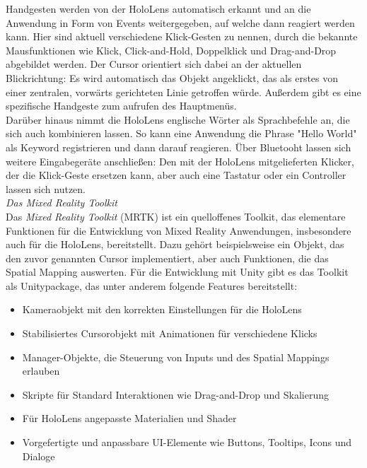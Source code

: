 Handgesten werden von der HoloLens automatisch erkannt und an die Anwendung in Form von Events weitergegeben, auf welche dann reagiert werden kann. Hier sind aktuell verschiedene Klick-Gesten zu nennen, durch die bekannte Mausfunktionen wie Klick, Click-and-Hold, Doppelklick und Drag-and-Drop abgebildet werden. Der Cursor orientiert sich dabei an der aktuellen Blickrichtung: Es wird automatisch das Objekt angeklickt, das als erstes von einer zentralen, vorwärts gerichteten Linie getroffen würde. Außerdem gibt es eine spezifische Handgeste zum aufrufen des Hauptmenüs.\\

Darüber hinaus nimmt die HoloLens englische Wörter als Sprachbefehle an, die sich auch kombinieren lassen. So kann eine Anwendung die Phrase "Hello World" als Keyword registrieren und dann darauf reagieren. Über Bluetooht lassen sich weitere Eingabegeräte anschließen: Den mit der HoloLens mitgelieferten Klicker, der die Klick-Geste ersetzen kann, aber auch eine Tastatur oder ein Controller lassen sich nutzen.\\

\vspace{4px}
\textit{Das Mixed Reality Toolkit}\\
Das \textit{Mixed Reality Toolkit} (MRTK) ist ein quelloffenes Toolkit, das elementare Funktionen für die Entwicklung von Mixed Reality Anwendungen, insbesondere auch für die HoloLens, bereitstellt. Dazu gehört beispielsweise ein Objekt, das den zuvor genannten Cursor implementiert, aber auch Funktionen, die das Spatial Mapping auswerten. Für die Entwicklung mit Unity gibt es das Toolkit als Unitypackage, das unter anderem folgende Features bereitstellt:

\begin{itemize}
	\setlength{\itemsep}{-5pt}
	\item Kameraobjekt mit den korrekten Einstellungen für die HoloLens
	\item Stabilisiertes Cursorobjekt mit Animationen für verschiedene Klicks
	\item Manager-Objekte, die Steuerung von Inputs und des Spatial Mappings erlauben
	\item Skripte für Standard Interaktionen wie Drag-and-Drop und Skalierung
	\item Für HoloLens angepasste Materialien und Shader
	\item Vorgefertigte und anpassbare UI-Elemente wie Buttons, Tooltips, Icons und Dialoge
\end{itemize}


